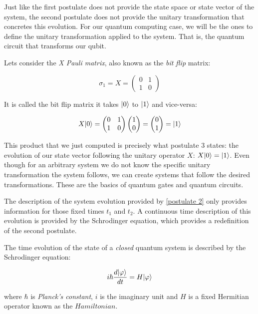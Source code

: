 Just like the first postulate does not provide the state space or state vector of the system, the second postulate does not provide the unitary transformation that concretes this evolution. For our quantum computing case, we will be the ones to define the unitary transformation applied to the system. That is, the quantum circuit that transforms our qubit.

\begin{exampleth} Lets consider the \emph{X Pauli matrix}, also known as the \emph{bit flip} matrix:
	
	$$ \sigma_1 = X = 
	\begin{pmatrix}
		0 & 1 \\
		1 & 0 
	\end{pmatrix}
	$$
	
	It is called the bit flip matrix it takes $|0\rangle$ to $|1\rangle$ and vice-versa:
	
	$$  X|0\rangle = 
	\begin{pmatrix}
		0 & 1 \\
		1 & 0 
	\end{pmatrix}
	\begin{pmatrix}
		1 \\
		0 
	\end{pmatrix}=
	\begin{pmatrix}
		0 \\
		1 
	\end{pmatrix} =
	|1\rangle
	$$
	
	This product that we just computed is precisely what postulate 3 states: the evolution of our state vector following the unitary operator $X$: $X|0\rangle = |1\rangle$. Even though for an arbitrary system we do not know the specific unitary transformation the system follows, we can create systems that follow the desired transformations. These are the basics of quantum gates and quantum circuits. 
\end{exampleth}

The description of the system evolution provided by \ref{postulate 2} only provides information for those fixed times $t_1$ and $t_2$. A continuous time description of this evolution is provided by the Schrodinger equation, which provides a redefinition of the second postulate.


\begin{postulate 3'}
	The time evolution of the state of a \emph{closed} quantum system is described by the Schrodinger equation:
	
	$$ i \hbar \frac{d|\varphi\rangle}{dt} = H|\varphi\rangle $$
	
	where $\hbar$ is \emph{Planck’s constant}, $i$ is the imaginary unit and $H$ is a fixed Hermitian operator known as the $Hamiltonian$.
\end{postulate 3'}

